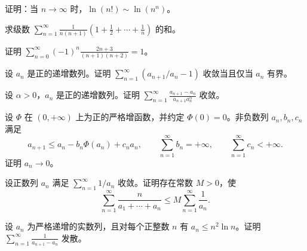 \noindent\begin{minipage}{\textwidth}
证明：当 $n\to\infty$ 时，$\ln(n!)\sim\ln(n^n)$。
\end{minipage}\par\vfill
\noindent\begin{minipage}{\textwidth}
求级数 $\displaystyle\sum_{n=1}^{\infty}\frac1{n(n+1)}\left(1+\frac12+\cdots+\frac1n\right)$ 的和。
\end{minipage}\par\vfill
\noindent\begin{minipage}{\textwidth}
证明 $\displaystyle\sum_{n=0}^{\infty}(-1)^n\frac{2n+3}{(n+1)(n+2)}=1$。
\end{minipage}\par\vfill
\newpage
\noindent\begin{minipage}{\textwidth}
设 $a_n$ 是正的递增数列。证明 $\sum_{n=1}^{\infty}(a_{n+1}/a_n-1)$ 收敛当且仅当 $a_n$ 有界。
\end{minipage}\par\vfill
\noindent\begin{minipage}{\textwidth}
设 $\alpha>0$，$a_n$ 是正的递增数列。证明 $\displaystyle\sum_{n=1}^{\infty}\frac{a_{n+1}-a_n}{a_{n+1}a_n^\alpha}$ 收敛。
\end{minipage}\par\vfill
\noindent\begin{minipage}{\textwidth}
设 $\Phi$ 在 $(0,+\infty)$ 上为正的严格增函数，并约定 $\Phi(0)=0$。非负数列 $a_n,b_n,c_n$ 满足\[a_{n+1}\le a_n-b_n\Phi(a_n)+c_na_n,\qquad\sum_{n=1}^{\infty}b_n=+\infty,\qquad\sum_{n=1}^{\infty}c_n<+\infty.\]证明 $a_n\to0$。
\end{minipage}\par\vfill
\noindent\begin{minipage}{\textwidth}
设正数列 $a_n$ 满足 $\sum_{n=1}^{\infty}1/a_n$ 收敛。证明存在常数 $M>0$，使\[\sum_{n=1}^{\infty}\frac n{a_1+\cdots+a_n}\le M\sum_{n=1}^{\infty}\frac1{a_n}.\]
\end{minipage}\par\vfill
\newpage
\noindent\begin{minipage}{\textwidth}
设 $a_n$ 为严格递增的实数列，且对每个正整数 $n$ 有 $a_n\le n^2\ln n$。证明 $\displaystyle\sum_{n=1}^{\infty}\frac1{a_{n+1}-a_n}$ 发散。
\end{minipage}\par\vfill
